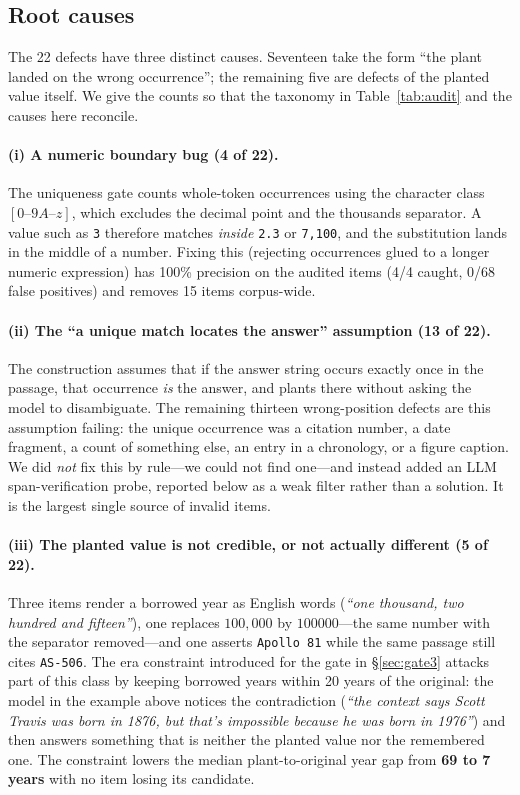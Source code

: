 \documentclass[11pt]{article}
\begin{document}
\subsection{Root causes}
The 22 defects have three distinct causes. Seventeen take the form ``the plant landed on the
wrong occurrence''; the remaining five are defects of the planted value itself. We give the
counts so that the taxonomy in Table~\ref{tab:audit} and the causes here reconcile.

\paragraph{(i) A numeric boundary bug (4 of 22).} The uniqueness gate counts whole-token
occurrences using the character class $[0\text{--}9A\text{--}z]$, which excludes the decimal
point and the thousands separator. A value such as \texttt{3} therefore matches
\emph{inside} \texttt{2.3} or \texttt{7,100}, and the substitution lands in the middle of a
number. Fixing this (rejecting occurrences glued to a longer numeric expression) has 100\%
precision on the audited items (4/4 caught, 0/68 false positives) and removes 15 items
corpus-wide.

\paragraph{(ii) The ``a unique match locates the answer'' assumption (13 of 22).} The
construction assumes that if the answer string occurs exactly once in the passage, that
occurrence \emph{is} the answer, and plants there without asking the model to disambiguate.
The remaining thirteen wrong-position defects are this assumption failing: the unique
occurrence was a citation number, a date fragment, a count of something else, an entry in a
chronology, or a figure caption. We did \emph{not} fix this by rule---we could not find
one---and instead added an LLM span-verification probe, reported below as a weak filter
rather than a solution. It is the largest single source of invalid items.

\paragraph{(iii) The planted value is not credible, or not actually different (5 of 22).}
Three items render a borrowed year as English words (\emph{``one thousand, two hundred and
fifteen''}), one replaces $100{,}000$ by $100000$---the same number with the separator
removed---and one asserts \texttt{Apollo 81} while the same passage still cites
\texttt{AS-506}. The era constraint introduced for the gate in \S\ref{sec:gate3} attacks part
of this class by keeping borrowed years within 20 years of the original: the model in the
example above notices the contradiction (\emph{``the context says Scott Travis was born in
1876, but that's impossible because he was born in 1976''}) and then answers something that
is neither the planted value nor the remembered one. The constraint lowers the median
plant-to-original year gap from \textbf{69 to 7 years} with no item losing its candidate.
\end{document}
